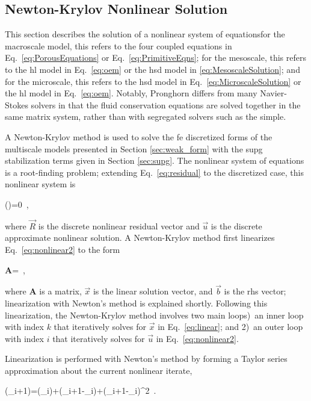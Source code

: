 \subsection{Newton-Krylov Nonlinear Solution}
\label{sec:nonlinear}

This section describes the solution of a nonlinear system of equations\mdash for the macroscale model, this refers to the four coupled equations in Eq.\ \eqref{eq:PorousEquations} or Eq.\ \eqref{eq:PrimitiveEqns}; for the mesoscale, this refers to the \gls{hl} model in Eq.\ \eqref{eq:oem} or the \gls{hsd} model in \eqref{eq:MesoscaleSolution}; and for the microscale, this refers to the \gls{hsd} model in Eq.\ \eqref{eq:MicroscaleSolution} or the \gls{hl} model in Eq.\ \eqref{eq:oem}. Notably, Pronghorn differs from many Navier-Stokes solvers in that the fluid conservation equations are solved together in the same matrix system, rather than with segregated solvers such as the \gls{simple}.

A Newton-Krylov method is used to solve the \gls{fe} discretized forms of the multiscale models presented in Section \ref{sec:weak_form} with the \gls{supg} stabilization terms given in Section \ref{sec:supg}. The nonlinear system of equations is a root-finding problem; extending Eq.\ \eqref{eq:residual} to the discretized case, this nonlinear system is

\beq
\label{eq:nonlinear2}
()=0\ ,
\eeq

\noindent where \(\vec{R}\) is the discrete nonlinear residual vector and \(\vec{u}\) is the discrete approximate nonlinear solution. A Newton-Krylov method first linearizes Eq.\ \eqref{eq:nonlinear2} to the form

\beq
\label{eq:linear}
\textbf{A}=\ ,
\eeq

\noindent where \(\textbf{A}\) is a matrix, \(\vec{x}\) is the linear solution vector, and \(\vec{b}\) is the \gls{rhs} vector; linearization with Newton's method is explained shortly. Following this linearization, the Newton-Krylov method involves two main loops)~an inner loop with index \(k\) that iteratively solves for \(\vec{x}\) in Eq.\ \eqref{eq:linear}; and 2)~an outer loop with index \(i\) that iteratively solves for \(\vec{u}\) in Eq.\ \eqref{eq:nonlinear2}.

Linearization is performed with Newton's method by forming a Taylor series approximation about the current nonlinear iterate,

\beq
\label{eq:TaylorSeriesResidual}
(_{i+1})=(_i)+(_{i+1}-_i)+(_{i+1}-_i)^2\ .
\eeq


